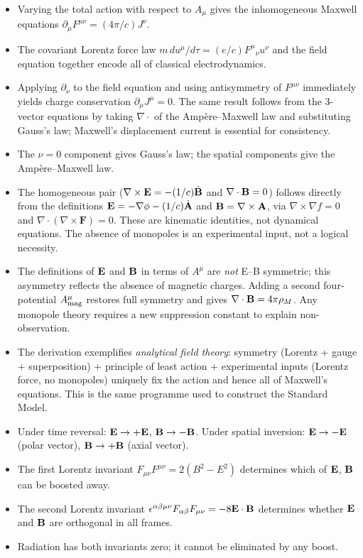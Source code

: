 \begin{itemize}
  \item Varying the total action with respect to $A_\mu$ gives the inhomogeneous Maxwell equations
        $\partial_\mu F^{\mu\nu}=(4\pi/c)J^\nu$.
  \item The covariant Lorentz force law $m\,du^\mu/d\tau = (e/c)F^\mu{}_\nu u^\nu$ and the field
        equation together encode all of classical electrodynamics.
  \item Applying $\partial_\nu$ to the field equation and using antisymmetry of $F^{\mu\nu}$
        immediately yields charge conservation $\partial_\mu J^\mu=0$.  The same result follows from
        the 3-vector equations by taking $\nabla\cdot$ of the Ampère--Maxwell law and substituting
        Gauss's law; Maxwell's displacement current is essential for consistency.
  \item The $\nu=0$ component gives Gauss's law; the spatial components give the Ampère--Maxwell law.
  \item The homogeneous pair ($\nabla\times\mathbf{E}=-(1/c)\dot{\mathbf{B}}$ and $\nabla\cdot\mathbf{B}=0$) follows
        directly from the definitions $\mathbf{E}=-\nabla\phi-(1/c)\dot{\mathbf{A}}$ and $\mathbf{B}=\nabla\times\mathbf{A}$,
        via $\nabla\times\nabla f=0$ and $\nabla\cdot(\nabla\times\mathbf{F})=0$.  These are kinematic
        identities, not dynamical equations.  The absence of monopoles is an experimental input, not
        a logical necessity.
  \item The definitions of $\mathbf{E}$ and $\mathbf{B}$ in terms of $A^\mu$ are \emph{not} E--B symmetric; this
        asymmetry reflects the absence of magnetic charges.  Adding a second four-potential
        $A^\mu_{\rm mag}$ restores full symmetry and gives $\nabla\cdot\mathbf{B}=4\pi\rho_M$.  Any
        monopole theory requires a new suppression constant to explain non-observation.
  \item The derivation exemplifies \emph{analytical field theory}: symmetry (Lorentz + gauge +
        superposition) + principle of least action + experimental inputs (Lorentz force, no monopoles)
        uniquely fix the action and hence all of Maxwell's equations.  This is the same programme
        used to construct the Standard Model.
  \item Under time reversal: $\mathbf{E}\to+\mathbf{E}$, $\mathbf{B}\to-\mathbf{B}$.  Under spatial inversion: $\mathbf{E}\to-\mathbf{E}$
        (polar vector), $\mathbf{B}\to+\mathbf{B}$ (axial vector).
  \item The first Lorentz invariant $F_{\mu\nu}F^{\mu\nu}=2(B^2-E^2)$ determines which of $\mathbf{E}$,
        $\mathbf{B}$ can be boosted away.
  \item The second Lorentz invariant $\epsilon^{\alpha\beta\mu\nu}F_{\alpha\beta}F_{\mu\nu}=-8\mathbf{E}\cdot\mathbf{B}$
        determines whether $\mathbf{E}$ and $\mathbf{B}$ are orthogonal in all frames.
  \item Radiation has both invariants zero; it cannot be eliminated by any boost.
\end{itemize}
